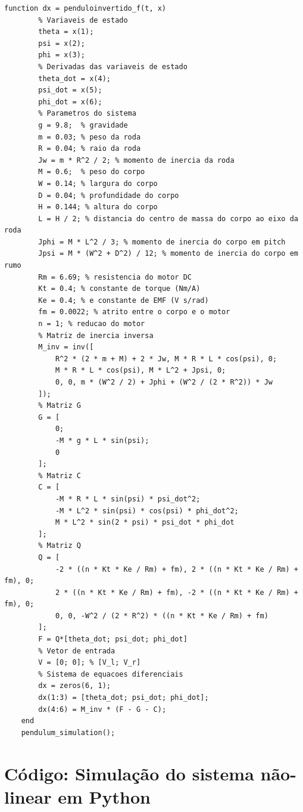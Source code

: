\documentclass[10pt]{article}
\begin{document}
\begin{appendices}
\begin{lstlisting}[caption={Código da simulação do sistema não-linear com ode45}, label=lst:pendulum_sim]
    function dx = penduloinvertido_f(t, x)
        % Variaveis de estado
        theta = x(1);
        psi = x(2);
        phi = x(3);
        % Derivadas das variaveis de estado
        theta_dot = x(4);
        psi_dot = x(5);
        phi_dot = x(6);
        % Parametros do sistema
        g = 9.8;  % gravidade
        m = 0.03; % peso da roda
        R = 0.04; % raio da roda
        Jw = m * R^2 / 2; % momento de inercia da roda
        M = 0.6;  % peso do corpo
        W = 0.14; % largura do corpo
        D = 0.04; % profundidade do corpo
        H = 0.144; % altura do corpo
        L = H / 2; % distancia do centro de massa do corpo ao eixo da roda
        Jphi = M * L^2 / 3; % momento de inercia do corpo em pitch
        Jpsi = M * (W^2 + D^2) / 12; % momento de inercia do corpo em rumo
        Rm = 6.69; % resistencia do motor DC
        Kt = 0.4; % constante de torque (Nm/A)
        Ke = 0.4; % e constante de EMF (V s/rad)
        fm = 0.0022; % atrito entre o corpo e o motor
        n = 1; % reducao do motor
        % Matriz de inercia inversa
        M_inv = inv([
            R^2 * (2 * m + M) + 2 * Jw, M * R * L * cos(psi), 0;
            M * R * L * cos(psi), M * L^2 + Jpsi, 0;
            0, 0, m * (W^2 / 2) + Jphi + (W^2 / (2 * R^2)) * Jw
        ]);
        % Matriz G
        G = [
            0;
            -M * g * L * sin(psi);
            0
        ];
        % Matriz C
        C = [
            -M * R * L * sin(psi) * psi_dot^2;
            -M * L^2 * sin(psi) * cos(psi) * phi_dot^2;
            M * L^2 * sin(2 * psi) * psi_dot * phi_dot
        ];
        % Matriz Q
        Q = [
            -2 * ((n * Kt * Ke / Rm) + fm), 2 * ((n * Kt * Ke / Rm) + fm), 0;
            2 * ((n * Kt * Ke / Rm) + fm), -2 * ((n * Kt * Ke / Rm) + fm), 0;
            0, 0, -W^2 / (2 * R^2) * ((n * Kt * Ke / Rm) + fm)
        ];
        F = Q*[theta_dot; psi_dot; phi_dot]
        % Vetor de entrada
        V = [0; 0]; % [V_l; V_r]
        % Sistema de equacoes diferenciais
        dx = zeros(6, 1);
        dx(1:3) = [theta_dot; psi_dot; phi_dot];
        dx(4:6) = M_inv * (F - G - C);
    end
    pendulum_simulation();
\end{lstlisting}

\section{Código: Simulação do sistema não-linear em Python}


\end{appendices}
\end{document}
